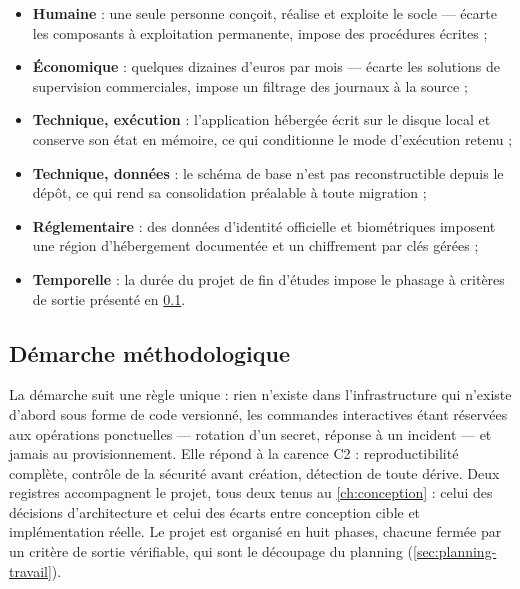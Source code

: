 \begin{itemize}\setlength{\itemsep}{1pt}
  \item \textbf{Humaine} : une seule personne conçoit, réalise et exploite le socle --- écarte les composants à exploitation permanente, impose des procédures écrites ;
  \item \textbf{Économique} : quelques dizaines d'euros par mois --- écarte les solutions de supervision commerciales, impose un filtrage des journaux à la source ;
  \item \textbf{Technique, exécution} : l'application hébergée écrit sur le disque local et conserve son état en mémoire, ce qui conditionne le mode d'exécution retenu ;
  \item \textbf{Technique, données} : le schéma de base n'est pas reconstructible depuis le dépôt, ce qui rend sa consolidation préalable à toute migration ;
  \item \textbf{Réglementaire} : des données d'identité officielle et biométriques imposent une région d'hébergement documentée et un chiffrement par clés gérées ;
  \item \textbf{Temporelle} : la durée du projet de fin d'études impose le phasage à critères de sortie présenté en \cref{subsec:demarche}.
\end{itemize}

\subsection{Démarche méthodologique}
\label{subsec:demarche}

La démarche suit une règle unique : rien n'existe dans l'infrastructure qui n'existe d'abord sous
forme de code versionné, les commandes interactives étant réservées aux opérations ponctuelles
--- rotation d'un secret, réponse à un incident --- et jamais au provisionnement. Elle répond à
la carence C2 : reproductibilité complète, contrôle de la sécurité avant création, détection de
toute dérive. Deux registres accompagnent le projet, tous deux tenus au \cref{ch:conception} :
celui des décisions d'architecture et celui des écarts entre conception cible et implémentation
réelle. Le projet est organisé en huit phases, chacune fermée par un critère de sortie
vérifiable, qui sont le découpage du planning (\cref{sec:planning-travail}).

